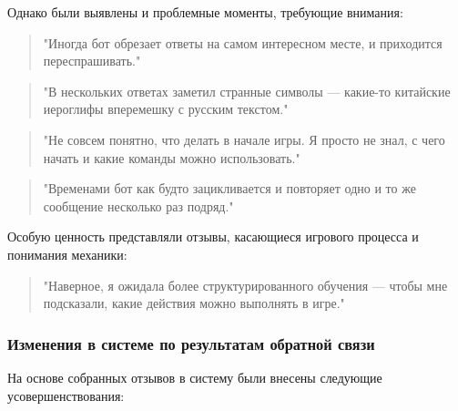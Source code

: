 Однако были выявлены и проблемные моменты, требующие внимания:

\begin{quote}
"{}Иногда бот обрезает ответы на самом интересном месте, и приходится переспрашивать."{}
\end{quote}

\begin{quote}
"{}В нескольких ответах заметил странные символы — какие-то китайские иероглифы вперемешку с русским текстом."{}
\end{quote}

\begin{quote}
"{}Не совсем понятно, что делать в начале игры. Я просто не знал, с чего начать и какие команды можно использовать."{}
\end{quote}

\begin{quote}
"{}Временами бот как будто зацикливается и повторяет одно и то же сообщение несколько раз подряд."{}
\end{quote}

Особую ценность представляли отзывы, касающиеся игрового процесса и понимания механики:

\begin{quote}
"{}Наверное, я ожидала более структурированного обучения — чтобы мне подсказали, какие действия можно выполнять в игре."{}
\end{quote}

\subsubsection{Изменения в системе по результатам обратной связи}

На основе собранных отзывов в систему были внесены следующие усовершенствования:

